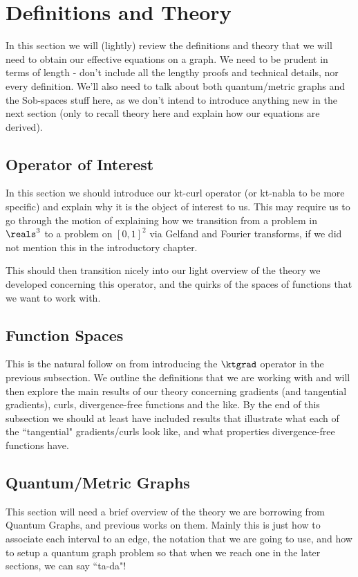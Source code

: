 \section{Definitions and Theory} \label{sec:DefsAndTheory}

In this section we will (lightly) review the definitions and theory that we will need to obtain our effective equations on a graph.
We need to be prudent in terms of length - don't include all the lengthy proofs and technical details, nor every definition.
We'll also need to talk about both quantum/metric graphs and the Sob-spaces stuff here, as we don't intend to introduce anything new in the next section (only to recall theory here and explain how our equations are derived).

\subsection{Operator of Interest} \label{ssec:ktCurls}
In this section we should introduce our kt-curl operator (or kt-nabla to be more specific) and explain why it is the object of interest to us.
This may require us to go through the motion of explaining how we transition from a problem in $\reals^3$ to a problem on $[0,1]^2$ via Gelfand and Fourier transforms, if we did not mention this in the introductory chapter.

This should then transition nicely into our light overview of the theory we developed concerning this operator, and the quirks of the spaces of functions that we want to work with.

\subsection{Function Spaces} \label{ssec:FunctionSpaces}
This is the natural follow on from introducing the $\ktgrad$ operator in the previous subsection.
We outline the definitions that we are working with and will then explore the main results of our theory concerning gradients (and tangential gradients), curls, divergence-free functions and the like.
By the end of this subsection we should at least have included results that illustrate what each of the ``tangential" gradients/curls look like, and what properties divergence-free functions have.

\subsection{Quantum/Metric Graphs} \label{ssec:QuantumGraphs}
This section will need a brief overview of the theory we are borrowing from Quantum Graphs, and previous works on them.
Mainly this is just how to associate each interval to an edge, the notation that we are going to use, and how to setup a quantum graph problem so that when we reach one in the later sections, we can say ``ta-da"!